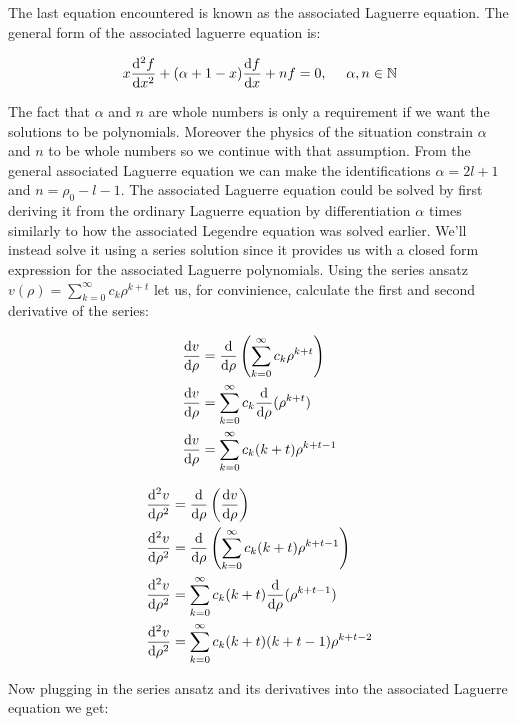 \documentclass{article}
\begin{document}
    The last equation encountered is known as the associated Laguerre equation. The general form of the associated laguerre equation is:

    \begin{equation}
        x\odv[order = 2]{f}{x} + (\alpha + 1 - x)\odv{f}{x} + nf = 0, \ \ \ \ \alpha, n \in \mathbb{N}
    \end{equation}

    The fact that $\alpha$ and $n$ are whole numbers is only a requirement if we want the solutions to be polynomials. Moreover the physics of the situation constrain $\alpha$ and $n$ to be
    whole numbers so we continue with that assumption. From the general associated Laguerre equation we can make the identifications $\alpha = 2l + 1$ and $n = \rho_{0} - l - 1$.
    The associated Laguerre equation could be solved by first deriving it from the ordinary Laguerre equation by differentiation $\alpha$ times similarly to how the associated Legendre equation
    was solved earlier. We'll instead solve it using a series solution since it provides us with a closed form expression for the associated Laguerre polynomials. Using the series ansatz
    $v(\rho) = \sum_{k = 0}^{\infty}c_k\rho^{k + t}$ let us, for convinience, calculate the first and second derivative of the series:

    \begin{align}
        \odv{v}{\rho} &= \odv{}{\rho}\left( \sum_{k = 0}^{\infty}c_k \rho^{k + t} \right) \\
        \odv{v}{\rho} &= \sum_{k = 0}^{\infty}c_k \odv{}{\rho}(\rho^{k + t}) \\
        \odv{v}{\rho} &= \sum_{k = 0}^{\infty}c_k (k + t)\rho^{k + t - 1}
    \end{align}

    \begin{align}
        \odv[order = 2]{v}{\rho} &= \odv{}{\rho}\left( \odv{v}{\rho} \right) \\
        \odv[order = 2]{v}{\rho} &= \odv{}{\rho}\left(\sum_{k = 0}^{\infty}c_k (k + t)\rho^{k + t - 1}  \right) \\
        \odv[order = 2]{v}{\rho} &= \sum_{k = 0}^{\infty}c_k (k + t)\odv{}{\rho}(\rho^{k + t - 1}) \\
        \odv[order = 2]{v}{\rho} &= \sum_{k = 0}^{\infty}c_k (k + t)(k + t - 1)\rho^{k + t - 2} 
    \end{align}
    
    Now plugging in the series ansatz and its derivatives into the associated Laguerre equation we get:
\end{document}
